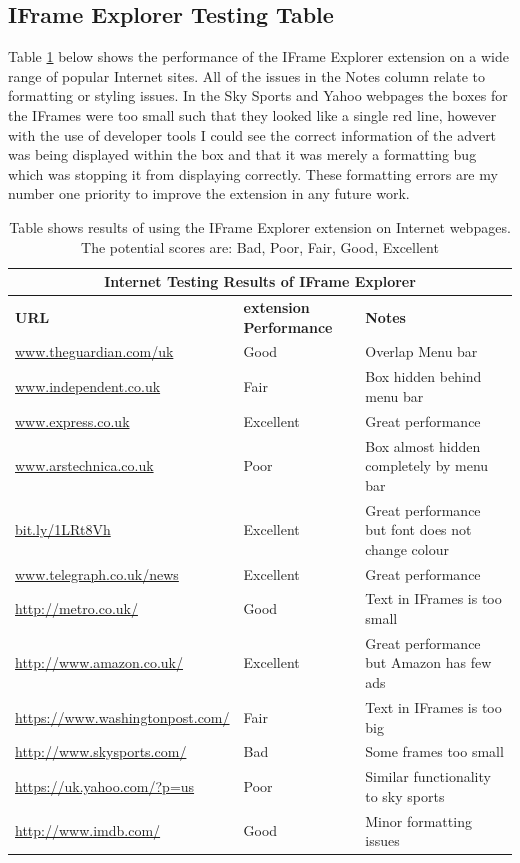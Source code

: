 \documentclass[12pt]{article}
\begin{document}
\subsection{IFrame Explorer Testing Table}  \label{iETesting}
Table \ref{table:4} below shows the performance of the IFrame Explorer extension on a wide range of popular Internet sites. All of the issues in the Notes column relate to formatting or styling issues. In the Sky Sports and Yahoo webpages the boxes for the IFrames were too small such that they looked like a single red line, however with the use of developer tools I could see the correct information of the advert was being displayed within the box and that it was merely a formatting bug which was stopping it from displaying correctly. These formatting errors are my number one priority to improve the extension in any future work. 

{
\begin{table} [H]
\centering
\begin{tabular}{ |p{5cm}|p{5cm}|p{5cm}|  }
\hline
\multicolumn{3}{|c|}{\textbf{Internet Testing Results of IFrame Explorer}} \\
\hline
\textbf{URL} & \textbf{extension Performance} & \textbf{Notes} \\
\hline
\url{www.theguardian.com/uk} & Good & Overlap Menu bar \\
\hline
\url{www.independent.co.uk} & Fair & Box hidden behind menu bar \\
\hline
\url{www.express.co.uk} & Excellent & Great performance \\
\hline
\url{www.arstechnica.co.uk} & Poor & Box almost hidden completely by menu bar  \\
\hline
\url{bit.ly/1LRt8Vh} & Excellent & Great performance but font does not change colour \\
\hline
\url{www.telegraph.co.uk/news} & Excellent & Great performance   \\
\hline
\url{http://metro.co.uk/} & Good & Text in IFrames is too small \\
\hline
\url{http://www.amazon.co.uk/} & Excellent & Great performance but Amazon has few ads  \\
\hline
\url{https://www.washingtonpost.com/} & Fair & Text in IFrames is too big \\
\hline
\url{http://www.skysports.com/} & Bad & Some frames too small \\
\hline
\url{https://uk.yahoo.com/?p=us} & Poor & Similar functionality to sky sports \\
\hline
\url{http://www.imdb.com/} & Good & Minor formatting issues \\
\hline
\end{tabular}
\caption{Table shows results of using the IFrame Explorer extension on Internet webpages. The potential scores are: Bad, Poor, Fair, Good, Excellent}
\label{table:4}
\end{table}
}
\end{document}

